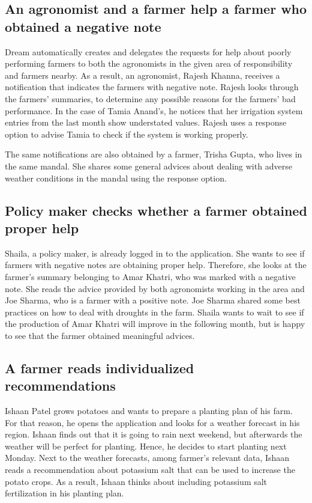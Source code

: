 \subsection*{An agronomist and a farmer help a farmer who obtained a negative note}
Dream automatically creates and delegates the requests for help about poorly performing farmers to both the agronomists in the given area of responsibility and farmers nearby. As a result, an agronomist, Rajesh Khanna, receives a notification that indicates the farmers with negative note. Rajesh looks through the farmers' summaries, to determine any possible reasons for the farmers' bad performance. In the case of Tamia Anand's, he notices that her irrigation system entries from the last month show understated values. Rajesh uses a response option to advise Tamia to check if the system is working properly. 

The same notifications are also obtained by a farmer, Trisha Gupta, who lives in the same mandal. She shares some general advices about dealing with adverse weather conditions in the mandal using the response option.

\subsection*{Policy maker checks whether a farmer obtained proper help}
Shaila, a policy maker, is already logged in to the application. She wants to see if farmers with negative notes are obtaining proper help. Therefore, she looks at the farmer's summary belonging to Amar Khatri, who was marked with a negative note. She reads the advice provided by both agronomists working in the area and Joe Sharma, who is a farmer with a positive note. Joe Sharma shared some best practices on how to deal with droughts in the farm. Shaila wants to wait to see if the production of Amar Khatri will improve in the following month, but is happy to see that the farmer obtained meaningful advices.

\subsection*{A farmer reads individualized recommendations}
Ishaan Patel grows potatoes and wants to prepare a planting plan of his farm. For that reason, he opens the application and looks for a weather forecast in his region. Ishaan finds out that it is going to rain next weekend, but afterwards the weather will be perfect for planting. Hence, he decides to start planting next Monday. Next to the weather forecasts, among farmer's relevant data, Ishaan reads a recommendation about potassium salt that can be used to increase the potato crops. As a result, Ishaan thinks about including potassium salt fertilization in his planting plan. 

